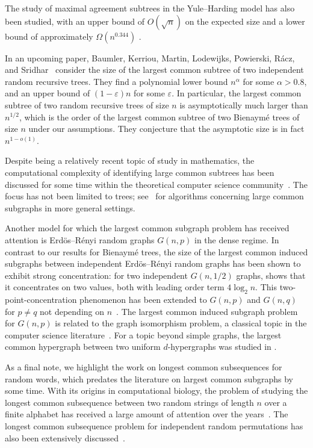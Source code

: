\documentclass[11pt,reqno]{amsart}
\newcommand{\1}{\mathbf{1}}
\newcommand{\0}{\mathbf{0}}
\newcommand{\eps}{\varepsilon}
\begin{document}
\smallskip
The study of maximal agreement subtrees in the Yule--Harding model has also been studied, with an upper bound of $O(\sqrt{n})$ on the expected size and a lower bound of approximately $\Omega(n^{0.344})$ \cite{david2003size,bernstein2015bounds}.
\smallskip

In an upcoming paper, Baumler, Kerriou, Martin, Lodewijks, Powierski, R\'acz, and Sridhar~\cite{RRT-LCS} consider the size of the largest common subtree of two independent random recursive trees. 
They find a polynomial lower bound $n^\alpha$ for some $\alpha>0.8$, and an upper bound of $(1-\eps)n$ for some $\eps$. In particular, the largest common subtree of two random recursive trees of size $n$ is asymptotically much larger than $n^{1/2}$, which is the order of the largest common subtree of two Bienaymé trees of size $n$ under our assumptions. They conjecture that the asymptotic size is in fact $n^{1-o(1)}$.
\smallskip

Despite being a relatively recent topic of study in mathematics, the computational complexity of identifying large common subtrees has been discussed for some time within the theoretical computer science community~\cite{akutsu1992RNC,shamir1999faster}. The focus has not been limited to trees; see~\cite{ehrlich2011maximum} for algorithms concerning large common subgraphs in more general settings.
\smallskip

Another model for which the largest common subgraph problem has received attention is Erd\"{o}s--R\'{e}nyi random graphs $G(n,p)$ in the dense regime. In contrast to our results for Bienaym\'{e} trees, the size of the largest common induced subgraphs between independent Erd\"{o}s--R\'{e}nyi random graphs has been shown to exhibit strong concentration: for two independent $G(n,1/2)$ graphs, \cite{chatterjee2023isomorphisms} shows that it concentrates on two values, both with leading order term $4 \log_2 n$. This two-point-concentration phenomenon has been extended to $G(n,p)$ and $G(n,q)$ for $p \ne q$  not depending on $n$~\cite{diamantidis2024combinatorial,surya2025isomorphisms}. The largest common induced subgraph problem for $G(n,p)$ is related to the graph isomorphism problem, a classical topic in the computer science literature~\cite{mccreesh2018subgraph}. For a topic beyond simple graphs, the largest common hypergraph between two uniform $d$-hypergraphs was studied in \cite{lenoir2024isomorphisms}.
\smallskip

As a final note, we highlight the work on longest common subsequences for random words, which predates the literature on largest common subgraphs by some time. With its origins in computational biology, the problem of studying the longest common subsequence between two random strings of length $n$ over a finite alphabet has received a large amount of attention over the years~\cite{Chvatal1975,Danvcik1995,Deken1979,Houdre2023,kiwi2005expected,Lueker2009}. The longest common subsequence problem for independent random permutations has also been extensively discussed~\cite{Romik_mono,Jin2019}.
\end{document}
